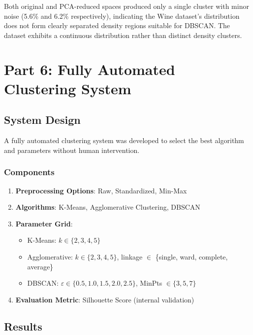 \documentclass[12pt,a4paper]{article}
\begin{document}
Both original and PCA-reduced spaces produced only a single cluster with minor noise (5.6\% and 6.2\% respectively), indicating the Wine dataset's distribution does not form clearly separated density regions suitable for DBSCAN. The dataset exhibits a continuous distribution rather than distinct density clusters.

\section{Part 6: Fully Automated Clustering System}

\subsection{System Design}

A fully automated clustering system was developed to select the best algorithm and parameters without human intervention.

\subsubsection{Components}

\begin{enumerate}
    \item \textbf{Preprocessing Options}: Raw, Standardized, Min-Max
    \item \textbf{Algorithms}: K-Means, Agglomerative Clustering, DBSCAN
    \item \textbf{Parameter Grid}:
    \begin{itemize}
        \item K-Means: $k \in \{2, 3, 4, 5\}$
        \item Agglomerative: $k \in \{2, 3, 4, 5\}$, linkage $\in$ \{single, ward, complete, average\}
        \item DBSCAN: $\varepsilon \in \{0.5, 1.0, 1.5, 2.0, 2.5\}$, MinPts $\in \{3, 5, 7\}$
    \end{itemize}
    \item \textbf{Evaluation Metric}: Silhouette Score (internal validation)
\end{enumerate}

\subsection{Results}
\end{document}
